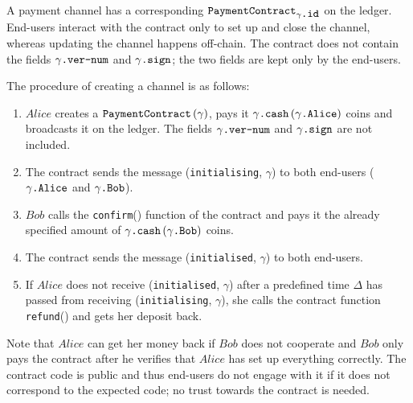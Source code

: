     A payment channel has a corresponding
    $\mbox{\texttt{PaymentContract}}_{\gamma\mbox{\texttt{.id}}}$ on the ledger. End-users
    interact with the contract only to set up and close the channel, whereas updating the
    channel happens off-chain. The contract does not contain the fields
    $\gamma\mbox{\texttt{.ver-num}}$ and $\gamma\mbox{\texttt{.sign}}$; the two fields are
    kept only by the end-users.

    The procedure of creating a channel is as follows:
    \begin{enumerate}
      \item $Alice$ creates a $\mbox{\texttt{PaymentContract}}\left(\gamma\right)$, pays
      it $\gamma\mbox{\texttt{.cash}}\left(\gamma\mbox{\texttt{.Alice}}\right)$ coins and
      broadcasts it on the ledger. The fields $\gamma\mbox{\texttt{.ver-num}}$ and
      $\gamma\mbox{\texttt{.sign}}$ are not included.
      \item The contract sends the message (\texttt{initialising}, $\gamma$) to both
      end-users ($\gamma\mbox{\texttt{.Alice}}$ and $\gamma\mbox{\texttt{.Bob}}$).
      \item $Bob$ calls the \texttt{confirm}() function of the contract and pays it the
      already specified amount of
      $\gamma\mbox{\texttt{.cash}}\left(\gamma\mbox{\texttt{.Bob}}\right)$ coins.
      \item The contract sends the message (\texttt{initialised}, $\gamma$) to both
      end-users.
      \item If $Alice$ does not receive (\texttt{initialised}, $\gamma$) after a
      predefined time $\Delta$ has passed from receiving (\texttt{initialising},
      $\gamma$), she calls the contract function \texttt{refund}() and gets her deposit
      back.
    \end{enumerate}

    Note that $Alice$ can get her money back if $Bob$ does not cooperate and $Bob$ only
    pays the contract after he verifies that $Alice$ has set up everything correctly. The
    contract code is public and thus end-users do not engage with it if it does not
    correspond to the expected code; no trust towards the contract is needed.

